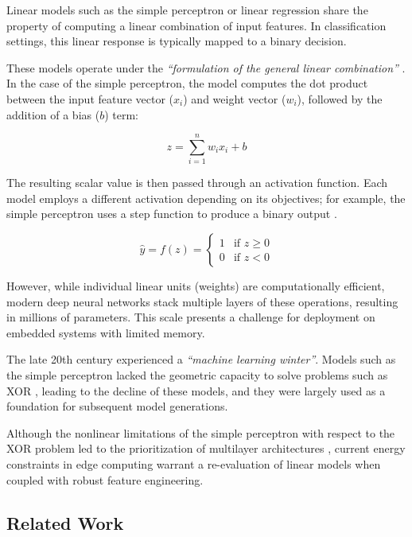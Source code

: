 \documentclass[conference]{IEEEtran}
\begin{document}
Linear models such as the simple perceptron \cite{b7} or linear regression \cite{b4} share the property of computing a linear combination of input features. In classification settings, this linear response is typically mapped to a binary decision.

These models operate under the \textit{``formulation of the general linear combination''} \cite{b4}. In the case of the simple perceptron, the model computes the dot product between the input feature vector ($x_i$) and weight vector ($w_i$), followed by the addition of a bias ($b$) term:

\begin{equation}
z = \sum_{i=1}^{n} w_i x_i + b
\end{equation}

The resulting scalar value is then passed through an activation function. Each model employs a different activation depending on its objectives; for example, the simple perceptron uses a step function to produce a binary output \cite{b7}.

\begin{equation}
\hat{y} = f(z) = \begin{cases} 1 & \text{if } z \geq 0 \\ 0 & \text{if } z < 0 \end{cases}
\end{equation}

However, while individual linear units (weights) are computationally efficient, modern deep neural networks stack multiple layers of these operations, resulting in millions of parameters. This scale presents a challenge for deployment on embedded systems with limited memory.

The late 20th century experienced a \textit{``machine learning winter''}. Models such as the simple perceptron lacked the geometric capacity to solve problems such as XOR \cite{b6}, leading to the decline of these models, and they were largely used as a foundation for subsequent model generations.

Although the nonlinear limitations of the simple perceptron with respect to the XOR problem led to the prioritization of multilayer architectures \cite{b6}, current energy constraints in edge computing warrant a re-evaluation of linear models when coupled with robust feature engineering.

\subsection{Related Work}
\end{document}
